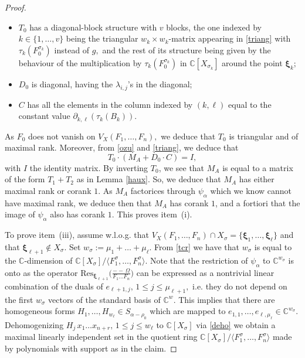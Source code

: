 \documentclass[a4paper,11pt]{amsart}
\newcommand{\C}{\mathbb{C}}
\newcommand{\bfxi}{{\boldsymbol{\xi}}}
\numberwithin{thm}{section}
\numberwithin{equation}{section}
\theoremstyle{definition}
\theoremstyle{plain}
\begin{document}
\begin{proof}
\begin{itemize}
\item $T_0$ has a diagonal-block structure with $v$ blocks, the one indexed by $k\in\{1,\ldots, v\}$ being the 
triangular $w_k \times w_k$-matrix appearing in \eqref{triang} with $\tau_k(F^{\sigma_k}_0)$ instead of $g,$ and the rest of
 its structure being given by  the behaviour of the multiplication by $\tau_k(F^{\sigma_k}_0)$ in $\C[X_{\sigma_k}]$ around the point $\bfxi_k;$
\item $D_0$ is diagonal, having the $\lambda_{i,j}$'s in the diagonal;
\item $C$  has all the elements in the column indexed by $(k,\ell)$ equal to the constant value $\partial_{k,\ell}(\tau_k(B_k)).$ 
\end{itemize}
As $F_0$ does not vanish on $V_X(F_1,\ldots, F_n),$  we deduce that $T_0$ is triangular and of maximal rank. Moreover, 
from \eqref{ozu} and \eqref{triang}, we deduce that
$$T_0\cdot(M_A+D_0\cdot C)=I,
$$
with $I$ the identity matrix.  By inverting $T_0$, we see that $M_A$ is equal to a matrix of the form
 $T_1+T_2$ as in Lemma \ref{haux}. So, we deduce that $M_A$ has either maximal rank or corank $1.$ 
As $M_A$ factorices through $\psi_\alpha$ which we know cannot have maximal rank, we deduce then that $M_A$ 
has corank $1$, and a fortiori that the image of $\psi_\alpha$ also has corank $1$. This proves item~(i).




To prove item~(iii), assume w.l.o.g. that $V_{X}(F_1,\ldots, F_n)\cap X_\sigma=\{\bfxi_1,\ldots,\bfxi_\ell\}$ and that $\bfxi_{\ell+1}\notin X_\sigma.$ Set  $w_\sigma:=\mu_1+\ldots+\mu_\ell.$ From \eqref{tcr} we have that $w_\sigma$ is equal to the 
$\C$-dimension of $\C[X_\sigma]/\langle F_1^\sigma,\ldots, F_n^\sigma\rangle$.  Note that the restriction of  $\psi_{\alpha}$ to $\C^{w_\sigma}$ is onto as the operator
$\mbox{Res}_{\bfxi_{\ell+1}}\Big(\frac{--\,\Omega}{F_1\ldots F_n}\Big)$ can be 
expressed as a nontrivial linear combination of the duals of $e_{\ell+1, j},\, 1\leq j\leq \mu_{\ell+1},$ i.e. they do not depend 
on the first $w_\sigma$ vectors of the standard basis of $\C^w.$
This implies that there are homogeneous forms $H_1,\ldots, H_{w_\ell}\in S_{\alpha-\rho_0}$ which are mapped to $e_{1,1},\ldots, e_{\ell,\mu_\ell}\in\C^{w_\sigma}.$ Dehomogenizing $H_j\,x_1\ldots x_{n+r},\,1\leq j\leq w_\ell$ to $\C[X_\sigma]$ via \eqref{deho} we obtain a maximal linearly independent set in the quotient ring 
$\C[X_\sigma]/\langle F_1^\sigma,\ldots, F_n^\sigma\rangle$ made by polynomials with support as in the claim. 
\end{proof}
\end{document}

